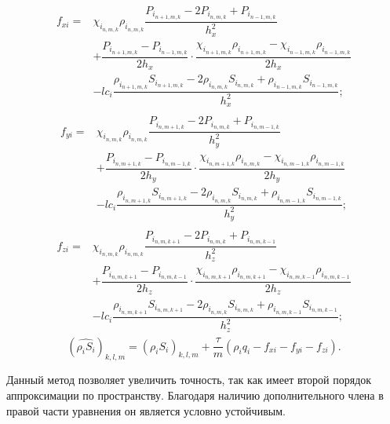 \begin{eqnarray*}
  \begin{aligned}
    f_{xi} =& \chi_{i_{n,m,k}} \rho_{i_{n,m,k}} \dfrac{P_{i_{n+1,m,k}} - 2P_{i_{n,m,k}} + P_{i_{n-1,m,k}}}{h_x^2} \\
    &+ \dfrac{P_{i_{n+1,m,k}}-P_{i_{n-1,m,k}}}{2h_x} \cdot \dfrac{\chi_{i_{n+1,m,k}} \rho_{i_{n+1,m,k}}-\chi_{i_{n-1,m,k}} \rho_{i_{n-1,m,k}}}{2h_x} \\
    &- lc_i\dfrac{\rho_{i_{n+1,m,k}}S_{i_{n+1,m,k}} - 2\rho_{i_{n,m,k}}S_{i_{n,m,k}} + \rho_{i_{n-1,m,k}}S_{i_{n-1,m,k}}}{h_x^2};
  \end{aligned}
\end{eqnarray*}
\begin{eqnarray*}
  \begin{aligned}
    f_{yi} =& \chi_{i_{n,m,k}} \rho_{i_{n,m,k}} \dfrac{P_{i_{n,m+1,k}} - 2P_{i_{n,m,k}} + P_{i_{n,m-1,k}}}{h_y^2} \\
    &+ \dfrac{P_{i_{n,m+1,k}}-P_{i_{n,m-1,k}}}{2h_y} \cdot \dfrac{\chi_{i_{n,m+1,k}} \rho_{i_{n,m,k}}-\chi_{i_{n,m-1,k}} \rho_{i_{n,m-1,k}}}{2h_y} \\
    &- lc_i\dfrac{\rho_{i_{n,m+1,k}}S_{i_{n,m+1,k}} - 2\rho_{i_{n,m,k}}S_{i_{n,m,k}} + \rho_{i_{n,m-1,k}}S_{i_{n,m-1,k}}}{h_y^2};
  \end{aligned}
    \end{eqnarray*}
\begin{eqnarray*}
  \begin{aligned}
    f_{zi} =& \chi_{i_{n,m,k}} \rho_{i_{n,m,k}} \dfrac{P_{i_{n,m,k+1}} - 2P_{i_{n,m,k}} + P_{i_{n,m,k-1}}}{h_z^2} \\
    &+ \dfrac{P_{i_{n,m,k+1}}-P_{i_{n,m,k-1}}}{2h_z} \cdot \dfrac{\chi_{i_{n,m,k+1}} \rho_{i_{n,m,k+1}}-\chi_{i_{n,m,k-1}} \rho_{i_{n,m,k-1}}}{2h_z} \\
    &- lc_i\dfrac{\rho_{i_{n,m,k+1}}S_{i_{n,m,k+1}} - 2\rho_{i_{n,m,k}}S_{i_{n,m,k}} + \rho_{i_{n,m,k-1}}S_{i_{n,m,k-1}}}{h_z^2};
  \end{aligned}
\end{eqnarray*}
\begin{equation*}
    (\widehat{\rho_i S_i})_{k,l,m}=(\rho_i S_i)_{k,l,m}+\frac{\tau}{m}(\rho_i q_i - f_{xi} - f_{yi} - f_{zi}).
\end{equation*}

Данный метод позволяет увеличить точность, так как имеет второй порядок аппроксимации по пространству.
Благодаря наличию дополнительного члена в~ правой
части уравнения он является условно устойчивым.

